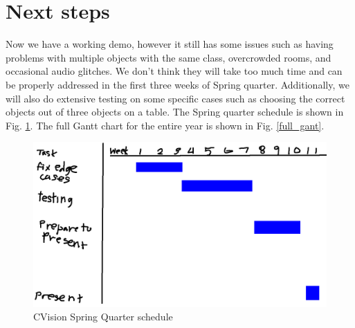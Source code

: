 \documentclass[12pt,a4paper]{article}
\begin{document}
\newpage
\section{Next steps}
Now we have a working demo, however it still has some issues such as having problems with multiple objects with the same class, overcrowded rooms, and occasional audio glitches.
We don't think they will take too much time and can be properly addressed in the first three weeks of Spring quarter. Additionally, we will also do extensive testing on some specific cases such as choosing the correct objects out of three objects on a table.
The Spring quarter schedule is shown in Fig. \ref{gant}. The full Gantt chart for the entire year is shown in Fig. \ref{full_gant}.
\begin{figure}[ht!]
    \center
    \includegraphics[width=1\linewidth]{gant.png}
    \caption{CVision Spring Quarter schedule}
    \label{gant}
  \end{figure}
\end{document}
